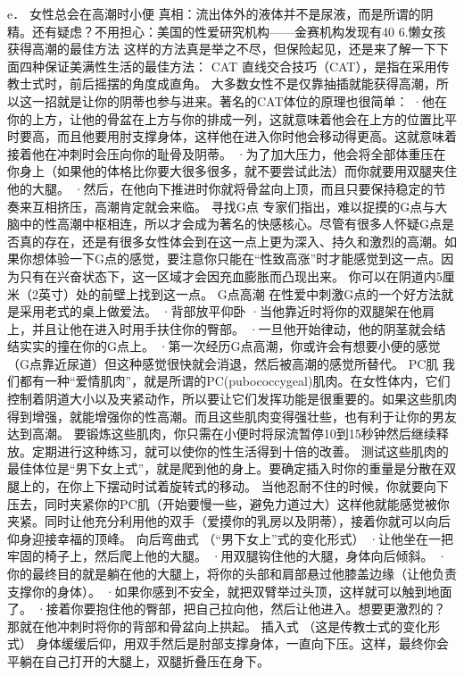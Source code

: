 \documentclass[12pt,UTF8,openany]{ctexbook}
\begin{document}
e． 女性总会在高潮时小便
真相：流出体外的液体并不是尿液，而是所谓的阴精。还有疑虑？不用担心：美国的性爱研究机构——金赛机构发现有40%
6.懒女孩获得高潮的最佳方法
这样的方法真是举之不尽，但保险起见，还是来了解一下下面四种保证美满性生活的最佳方法：
CAT
直线交合技巧（CAT），是指在采用传教士式时，前后摇摆的角度成直角。
大多数女性不是仅靠抽插就能获得高潮，所以这一招就是让你的阴蒂也参与进来。著名的CAT体位的原理也很简单：
·他在你的上方，让他的骨盆在上方与你的排成一列，这就意味着他会在上方的位置比平时要高，而且他要用肘支撑身体，这样他在进入你时他会移动得更高。这就意味着接着他在冲刺时会压向你的耻骨及阴蒂。
·为了加大压力，他会将全部体重压在你身上（如果他的体格比你要大很多很多，就不要尝试此法）而你就要用双腿夹住他的大腿。
·然后，在他向下推进时你就将骨盆向上顶，而且只要保持稳定的节奏来互相挤压，高潮肯定就会来临。
寻找G点
专家们指出，难以捉摸的G点与大脑中的性高潮中枢相连，所以才会成为著名的快感核心。尽管有很多人怀疑G点是否真的存在，还是有很多女性体会到在这一点上更为深入、持久和激烈的高潮。如果你想体验一下G点的感觉，要注意你只能在“性致高涨”时才能感觉到这一点。因为只有在兴奋状态下，这一区域才会因充血膨胀而凸现出来。
你可以在阴道内5厘米（2英寸）处的前壁上找到这一点。
G点高潮
在性爱中刺激G点的一个好方法就是采用老式的桌上做爱法。
·背部放平仰卧
·当他靠近时将你的双腿架在他肩上，并且让他在进入时用手扶住你的臀部。
·一旦他开始律动，他的阴茎就会结结实实的撞在你的G点上。
·第一次经历G点高潮，你或许会有想要小便的感觉（G点靠近尿道）但这种感觉很快就会消退，然后被高潮的感觉所替代。
PC肌
我们都有一种“爱情肌肉”，就是所谓的PC(pubococcygeal)肌肉。在女性体内，它们控制着阴道大小以及夹紧动作，所以要让它们发挥功能是很重要的。如果这些肌肉得到增强，就能增强你的性高潮。而且这些肌肉变得强壮些，也有利于让你的男友达到高潮。
要锻炼这些肌肉，你只需在小便时将尿流暂停10到15秒钟然后继续释放。定期进行这种练习，就可以使你的性生活得到十倍的改善。
测试这些肌肉的最佳体位是“男下女上式”，就是爬到他的身上。要确定插入时你的重量是分散在双腿上的，在你上下摆动时试着旋转式的移动。
当他忍耐不住的时候，你就要向下压去，同时夹紧你的PC肌（开始要慢一些，避免力道过大）这样他就能感觉被你夹紧。同时让他充分利用他的双手（爱摸你的乳房以及阴蒂），接着你就可以向后仰身迎接幸福的顶峰。
向后弯曲式
（“男下女上”式的变化形式）
·让他坐在一把牢固的椅子上，然后爬上他的大腿。
·用双腿钩住他的大腿，身体向后倾斜。
·你的最终目的就是躺在他的大腿上，将你的头部和肩部悬过他膝盖边缘（让他负责支撑你的身体）。
·如果你感到不安全，就把双臂举过头顶，这样就可以触到地面了。
·接着你要抱住他的臀部，把自己拉向他，然后让他进入。想要更激烈的？那就在他冲刺时将你的背部和骨盆向上拱起。
插入式
（这是传教士式的变化形式）
身体缓缓后仰，用双手然后是肘部支撑身体，一直向下压。这样，最终你会平躺在自己打开的大腿上，双腿折叠压在身下。
\end{document}
